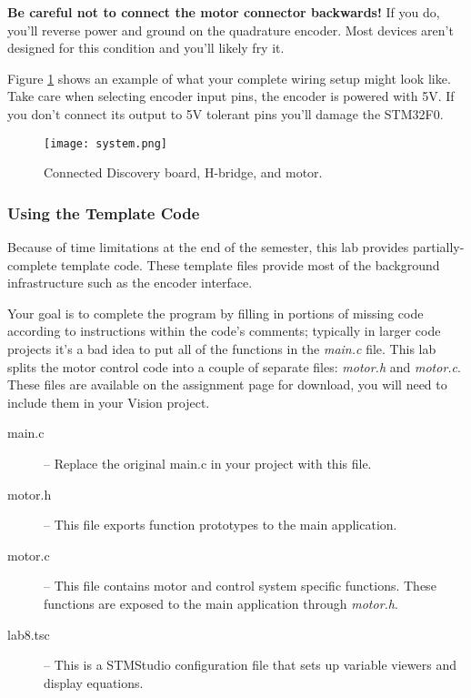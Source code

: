 \documentclass[openany,11pt,fleqn]{book} %
\begin{document}
\begin{warning}
    \textbf{Be careful not to connect the motor connector backwards!} If you do, you'll reverse power and ground on the quadrature encoder. Most devices aren't designed for this condition and you'll likely fry it.
\end{warning}
Figure \ref{system} shows an example of what your complete wiring setup might look like. Take care when selecting encoder input pins, the encoder is powered with 5V. If you don't connect its output to 5V tolerant pins you'll damage the STM32F0.

\begin{figure}[tb]
    \centering\texttt{[image: system.png]}
    \caption{Connected Discovery board, H-bridge, and motor.}
    \label{system}
\end{figure}

\subsubsection{Using the Template Code}
Because of time limitations at the end of the semester, this lab provides partially-complete template code. These template files provide most of the background infrastructure such as the encoder interface.

Your goal is to complete the program by filling in portions of missing code according to instructions within the code's comments; typically in larger code projects it's a bad idea to put all of the functions in the \textit{main.c} file. This lab splits the motor control code into a couple of separate files: \textit{motor.h} and \textit{motor.c}. These files are available on the assignment page for download, you will need to include them in your {\textmu}Vision project.

\begin{description}
    \item[main.c] -- Replace the original main.c in your project with this file.
    \item[motor.h] -- This file exports function prototypes to the main application.
    \item[motor.c] -- This file contains motor and control system specific functions. These functions are exposed to the main application through \textit{motor.h}. 
    \item[lab8.tsc] -- This is a STMStudio configuration file that sets up variable viewers and display equations.
\end{description}
\end{document}
